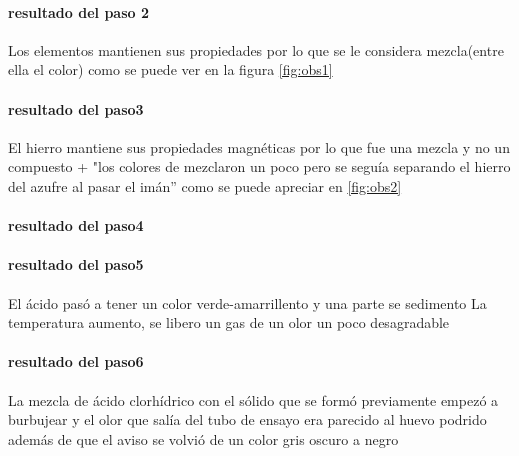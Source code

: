 \documentclass[letter]{article}
\begin{document}
\paragraph{resultado del paso 2}
Los elementos mantienen sus propiedades por lo que se le considera mezcla(entre ella el color) como se puede ver en la figura \ref{fig:obs1}
\paragraph{resultado del paso3}
El hierro mantiene sus propiedades magnéticas por lo que fue una mezcla y no un compuesto
+ "los colores de mezclaron un poco pero se seguía separando el hierro del azufre al pasar el imán” como se puede apreciar en \ref{fig:obs2}
\paragraph{resultado del paso4}

\paragraph{resultado del paso5}
 El ácido pasó a tener un color verde-amarrillento y una parte se sedimento 
La temperatura aumento, se libero un gas de un olor un poco desagradable
\paragraph{resultado del paso6}
La mezcla de ácido clorhídrico con el sólido que se formó previamente empezó a burbujear y el olor que salía del tubo de ensayo era parecido al huevo podrido además de que el aviso se volvió de un color gris oscuro a negro
\end{document}
